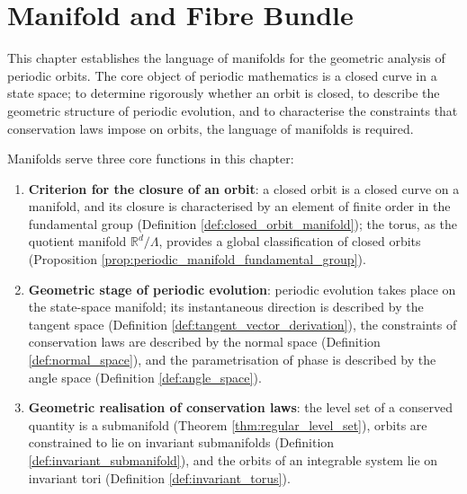 \chapter{Manifold and Fibre Bundle}
\label{chap:manifold}

\begin{remark}\label{rem:manifold_chapter_positioning}
This chapter establishes the language of manifolds for the geometric analysis of periodic orbits. The core object of periodic mathematics is a closed curve in a state space; to determine rigorously whether an orbit is closed, to describe the geometric structure of periodic evolution, and to characterise the constraints that conservation laws impose on orbits, the language of manifolds is required.

Manifolds serve three core functions in this chapter:
\begin{enumerate}[label=(\arabic*)]
    \item \textbf{Criterion for the closure of an orbit}: a closed orbit is a closed curve on a manifold, and its closure is characterised by an element of finite order in the fundamental group (Definition \ref{def:closed_orbit_manifold}); the torus, as the quotient manifold $\mathbb{R}^d/\Lambda$, provides a global classification of closed orbits (Proposition \ref{prop:periodic_manifold_fundamental_group}).
    \item \textbf{Geometric stage of periodic evolution}: periodic evolution takes place on the state-space manifold; its instantaneous direction is described by the tangent space (Definition \ref{def:tangent_vector_derivation}), the constraints of conservation laws are described by the normal space (Definition \ref{def:normal_space}), and the parametrisation of phase is described by the angle space (Definition \ref{def:angle_space}).
    \item \textbf{Geometric realisation of conservation laws}: the level set of a conserved quantity is a submanifold (Theorem \ref{thm:regular_level_set}), orbits are constrained to lie on invariant submanifolds (Definition \ref{def:invariant_submanifold}), and the orbits of an integrable system lie on invariant tori (Definition \ref{def:invariant_torus}).
\end{enumerate}


\end{remark}
